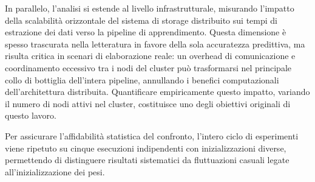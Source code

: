 In parallelo, l'analisi si estende al livello infrastrutturale, misurando l'impatto della scalabilità orizzontale del sistema di storage distribuito sui tempi di estrazione dei dati verso la pipeline di apprendimento. Questa dimensione è spesso trascurata nella letteratura in favore della sola accuratezza predittiva, ma risulta critica in scenari di elaborazione reale: un overhead di comunicazione e coordinamento eccessivo tra i nodi del cluster può trasformarsi nel principale collo di bottiglia dell'intera pipeline, annullando i benefici computazionali dell'architettura distribuita. Quantificare empiricamente questo impatto, variando il numero di nodi attivi nel cluster, costituisce uno degli obiettivi originali di questo lavoro.

Per assicurare l'affidabilità statistica del confronto, l'intero ciclo di esperimenti viene ripetuto su cinque esecuzioni indipendenti con inizializzazioni diverse, permettendo di distinguere risultati sistematici da fluttuazioni casuali legate all'inizializzazione dei pesi.




